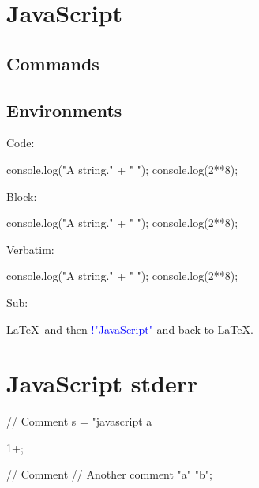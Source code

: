 \documentclass[11pt]{article}
\begin{document}
\section*{JavaScript}

\subsection*{Commands}




\printpythontex




\subsection*{Environments}

Code:
\begin{javascriptcode}
console.log("A string." + " ");
console.log(2**8);
\end{javascriptcode}

Block:
\begin{javascriptblock}
console.log("A string." + " ");
console.log(2**8);
\end{javascriptblock}

\printpythontex

Verbatim:
\begin{javascriptverbatim}
console.log("A string." + " ");
console.log(2**8);
\end{javascriptverbatim}

Sub:
\begin{javascriptsub}
\LaTeX\ and then \textcolor{blue}{!{"JavaScript"}} and back to \LaTeX.
\end{javascriptsub}


\section*{JavaScript stderr}


\begin{javascriptblock}[err1][numbers=left]
// Comment
s = "javascript a
\end{javascriptblock}

\stderrpythontex[][breaklines, breakafter=\\/]

\begin{javascriptblock}[err2][numbers=left]
1+;
\end{javascriptblock}

\stderrpythontex[][breaklines, breakafter=\\/]

\begin{javascriptblock}[err3][numbers=left]
// Comment
// Another comment
"a" "b";
\end{javascriptblock}

\stderrpythontex[][breaklines, breakafter=\\/]
\end{document}
